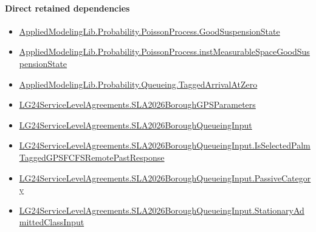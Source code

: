 \documentclass[10pt]{article}
\begin{document}
\paragraph{Direct retained dependencies}
\begin{itemize}\raggedright
\item \hyperlink{governing-declaration-ab1cfe37ad8c32b0}{Applied\allowbreak{}Modeling\allowbreak{}Lib.\allowbreak{}Probability.\allowbreak{}Poisson\allowbreak{}Process.\allowbreak{}Good\allowbreak{}Suspension\allowbreak{}State}
\item \hyperlink{governing-declaration-a8385d799d0a4d16}{Applied\allowbreak{}Modeling\allowbreak{}Lib.\allowbreak{}Probability.\allowbreak{}Poisson\allowbreak{}Process.\allowbreak{}inst\allowbreak{}Measurable\allowbreak{}Space\allowbreak{}Good\allowbreak{}Suspension\allowbreak{}State}
\item \hyperlink{governing-declaration-a69bedb5b0d420c6}{Applied\allowbreak{}Modeling\allowbreak{}Lib.\allowbreak{}Probability.\allowbreak{}Queueing.\allowbreak{}Tagged\allowbreak{}Arrival\allowbreak{}At\allowbreak{}Zero}
\item \hyperlink{governing-declaration-e9a32ba0a8f4decc}{LG24\allowbreak{}Service\allowbreak{}Level\allowbreak{}Agreements.\allowbreak{}SLA2026\allowbreak{}Borough\allowbreak{}GPS\allowbreak{}Parameters}
\item \hyperlink{governing-declaration-3e29dad51cd2861a}{LG24\allowbreak{}Service\allowbreak{}Level\allowbreak{}Agreements.\allowbreak{}SLA2026\allowbreak{}Borough\allowbreak{}Queueing\allowbreak{}Input}
\item \hyperlink{governing-declaration-4ec9f2b2741037de}{LG24\allowbreak{}Service\allowbreak{}Level\allowbreak{}Agreements.\allowbreak{}SLA2026\allowbreak{}Borough\allowbreak{}Queueing\allowbreak{}Input.\allowbreak{}Is\allowbreak{}Selected\allowbreak{}Palm\allowbreak{}Tagged\allowbreak{}GPSFCFS\allowbreak{}Remote\allowbreak{}Past\allowbreak{}Response}
\item \hyperlink{governing-declaration-abc91e26948cf0a3}{LG24\allowbreak{}Service\allowbreak{}Level\allowbreak{}Agreements.\allowbreak{}SLA2026\allowbreak{}Borough\allowbreak{}Queueing\allowbreak{}Input.\allowbreak{}Passive\allowbreak{}Category}
\item \hyperlink{governing-declaration-f3072ff54a3653c2}{LG24\allowbreak{}Service\allowbreak{}Level\allowbreak{}Agreements.\allowbreak{}SLA2026\allowbreak{}Borough\allowbreak{}Queueing\allowbreak{}Input.\allowbreak{}Stationary\allowbreak{}Admitted\allowbreak{}Class\allowbreak{}Input}

\end{itemize}
\end{document}
